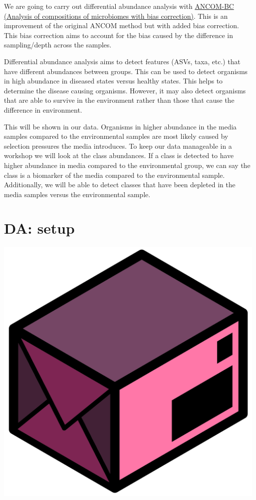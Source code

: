 \documentclass[
]{book}
\begin{document}
We are going to carry out differential abundance analysis with \href{https://www.nature.com/articles/s41467-020-17041-7}{ANCOM-BC (Analysis of compositions of microbiomes with bias correction)}.
This is an improvement of the original ANCOM method but with added bias correction.
This bias correction aims to account for the bias caused by the difference in sampling/depth across the samples.

Differential abundance analysis aims to detect features (ASVs, taxa, etc.) that have different abundances between groups.
This can be used to detect organisms in high abundance in diseased states versus healthy states.
This helps to determine the disease causing organisms.
However, it may also detect organisms that are able to survive in the environment rather than those that cause the difference in environment.

This will be shown in our data.
Organisms in higher abundance in the media samples compared to the environmental samples are most likely caused by selection pressures the media introduces.
To keep our data manageable in a workshop we will look at the class abundances.
If a class is detected to have higher abundance in media compared to the environmental group, we can say the class is a biomarker of the media compared to the environmental sample.
Additionally, we will be able to detect classes that have been depleted in the media samples versus the environmental sample.

\hypertarget{da-setup}{%
\section{DA: setup}\label{da-setup}}

\includegraphics{figures/packages_1.png}
\end{document}
